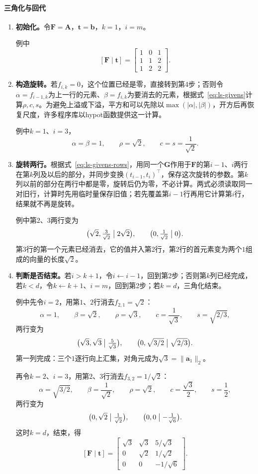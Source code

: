 \paragraph{三角化与回代}
\begin{enumerate}
 \item \textbf{初始化。}令$\bm F=\bm A$，$\bm t=\bm b$，$k=1$，$i=m$。

 例中
 \[
  [\bm F\mid\bm t]=\left[\begin{array}{cc|c}1&0&1\\1&1&2\\1&2&2\end{array}\right].
 \]

 \item \textbf{构造旋转。}若$f_{i,k}=0$，这个位置已经是零，直接转到第4步；否则令$\alpha=f_{i-1,k}$为上一行的元素、$\beta=f_{i,k}$为要消去的元素，根据式~\eqref{eq:ls-givens}计算$\rho,c,s$。为避免上溢或下溢，平方和可以先除以$\max(\lvert\alpha\rvert,\lvert\beta\rvert)$，开方后再恢复尺度，许多程序库以hypot函数提供这一计算。

 例中$k=1$、$i=3$，
 \[
  \alpha=\beta=1,\qquad \rho=\sqrt2,\qquad c=s=\frac1{\sqrt2}.
 \]

 \item \textbf{旋转两行。}根据式~\eqref{eq:ls-givens-rows}，用同一个$\bm G$作用于$\bm F$的第$i-1$、$i$两行在第$k$列及以后的部分，并同步变换$(t_{i-1},t_i)^\top$，保存这次旋转的参数。第$k$列以前的部分在两行中都是零，旋转后仍为零，不必计算。两式必须读取同一对旧行，计算时先用临时量保存旧值；若先覆盖第$i-1$行再用它计算第$i$行，结果就不再是旋转。

 例中第$2$、$3$两行变为
 \[
  \bigl(\sqrt2,\tfrac3{\sqrt2}\bigm|2\sqrt2\bigr),\qquad
  \bigl(0,\tfrac1{\sqrt2}\bigm|0\bigr).
 \]
 第3行的第一个元素已经消去，它的值并入第2行，第2行的首元素变为两个$1$组成的向量的长度$\sqrt2$。

 \item \textbf{判断是否结束。}若$i>k+1$，令$i\leftarrow i-1$，回到第2步；否则第$k$列已经完成，若$k<d$，令$k\leftarrow k+1$、$i=m$，回到第2步；若$k=d$，三角化结束。

 例中先令$i=2$，用第$1$、$2$行消去$f_{2,1}=\sqrt2$：
 \[
  \alpha=1,\qquad \beta=\sqrt2,\qquad \rho=\sqrt3,\qquad c=\frac1{\sqrt3},\qquad s=\sqrt{2/3},
 \]
 两行变为
 \[
  \bigl(\sqrt3,\sqrt3\bigm|\tfrac5{\sqrt3}\bigr),\qquad
  \bigl(0,\sqrt{3/2}\bigm|\sqrt{2/3}\bigr).
 \]
 第一列完成：三个$1$逐行向上汇集，对角元成为$\sqrt3=\lVert\bm a_1\rVert_2$。

 再令$k=2$、$i=3$，用第$2$、$3$行消去$f_{3,2}=1/\sqrt2$：
 \[
  \alpha=\sqrt{3/2},\qquad \beta=\frac1{\sqrt2},\qquad \rho=\sqrt2,\qquad c=\frac{\sqrt3}2,\qquad s=\frac12,
 \]
 两行变为
 \[
  \bigl(0,\sqrt2\bigm|\tfrac1{\sqrt2}\bigr),\qquad
  \bigl(0,0\bigm|-\tfrac1{\sqrt6}\bigr).
 \]
 这时$k=d$，结束，得
 \[
  [\bm F\mid\bm t]=\left[\begin{array}{cc|c}\sqrt3&\sqrt3&5/\sqrt3\\0&\sqrt2&1/\sqrt2\\0&0&-1/\sqrt6\end{array}\right].
 \]


\end{enumerate}
